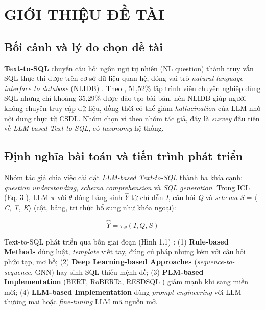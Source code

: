 \chapter{GIỚI THIỆU ĐỀ TÀI}

\section{Bối cảnh và lý do chọn đề tài}

\textbf{Text-to-SQL} chuyển câu hỏi ngôn ngữ tự nhiên (NL question) thành truy vấn SQL thực thi được trên cơ sở dữ liệu quan hệ, đóng vai trò \emph{natural language interface to database} (NLIDB) \cite{ref1}. Theo \cite{ref1}, 51,52\% lập trình viên chuyên nghiệp dùng SQL nhưng chỉ khoảng 35,29\% được đào tạo bài bản, nên NLIDB giúp người không chuyên truy cập dữ liệu, đồng thời có thể giảm \emph{hallucination} của LLM nhờ nội dung thực từ CSDL. Nhóm chọn \cite{ref1} vì theo nhóm tác giả, đây là \emph{survey} đầu tiên về \emph{LLM-based Text-to-SQL}, có \emph{taxonomy} hệ thống.

\section{Định nghĩa bài toán và tiến trình phát triển}

Nhóm tác giả chia việc cài đặt \emph{LLM-based Text-to-SQL} thành ba khía cạnh: \emph{question under\-standing}, \emph{schema compre\-hension} và \emph{SQL gene\-ration}. Trong ICL (Eq. 3 \cite{ref1}), LLM \emph{\ensuremath{\pi}} với \emph{\ensuremath{\theta}} đóng băng sinh \emph{\ensuremath{\hat{Y}}} từ chỉ dẫn \emph{I}, câu hỏi \emph{Q} và \emph{schema} \emph{S} = \ensuremath{\langle}\emph{C}, \emph{T}, \emph{K}\ensuremath{\rangle} (cột, bảng, tri thức bổ sung như khóa ngoại):

\begin{equation}
\hat{Y} = \pi_{\theta}(I,Q,S)
\end{equation}

Text-to-SQL phát triển qua bốn giai đoạn (Hình 1.1) \cite{ref1}: (1) \textbf{Rule-based Methods} dùng luật, \emph{template} viết tay, đúng cú pháp nhưng kém với câu hỏi phức tạp, mơ hồ; (2) \textbf{Deep Learning-based Approaches} (\emph{sequence-to-sequence}, GNN) hay sinh SQL thiếu mệnh đề; (3) \textbf{PLM-based Implementation} (BERT, RoBERTa, RESDSQL \cite{ref2}) giảm mạnh khi sang miền mới; (4) \textbf{LLM-based Implementation} dùng \emph{prompt engineering} với LLM thương mại hoặc \emph{fine-tuning} LLM mã nguồn mở.

